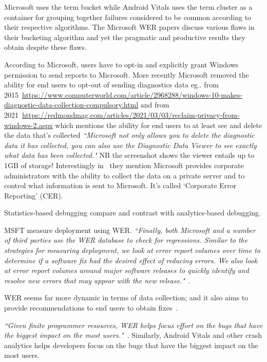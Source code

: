 Microsoft uses the term bucket while Android Vitals uses the term cluster as a container for grouping together failures considered to be common according to their respective algorithms. The Microsoft WER papers discuss various flaws in their bucketing algorithm and yet the pragmatic and productive results they obtain despite these flaws.

According to Microsoft, users have to opt-in and explicitly grant Windows permission to send reports to Microsoft. More recently Microsoft removed the ability for end users to opt-out of sending diagnostics data eg.. from 2015~\url{https://www.computerworld.com/article/2968288/windows-10-makes-diagnostic-data-collection-compulsory.html} and from 2021~\url{https://redmondmag.com/articles/2021/03/03/reclaim-privacy-from-windows-2.aspx} which mentions the ability for end users to at least see and delete the data that's collected \emph{``Microsoft not only allows you to delete the diagnostic data it has collected, you can also use the Diagnostic Data Viewer to see exactly what data has been collected."} NB the screenshot shows the viewer entails up to 1GB of storage! Interestingly in~\citep{kinshuman2009_debugging_in_the_very_large} they mention Microsoft provides corporate administrators with the ability to collect the data on a private server and to control what information is sent to Microsoft. It's called `Corporate Error Reporting' (CER).

Statistics-based debugging compare and contrast with analytics-based debugging.

MSFT measure deployment using WER. \emph{``Finally, both Microsoft and a number of third parties use the WER database to check for regressions. Similar to the strategies for measuring deployment, we look at error report volumes over time to determine if a software fix had the desired effect of reducing errors. We also look at error report volumes around major software releases to quickly identify and resolve new errors that may appear with the new release."}~\citep{kinshuman2009_debugging_in_the_very_large}.

WER seems far more dynamic in terms of data collection; and it also aims to provide recommendations to end users to obtain fixes~\citep{kinshuman2011_debugging_in_the_very_large}.

\emph{``Given finite programmer resources, WER helps focus effort on the bugs that have the biggest impact on the most users."}~\citep{kinshuman2009_debugging_in_the_very_large}. Similarly, Android Vitals and other crash analytics helps developers focus on the bugs that have the biggest impact on the most users.

